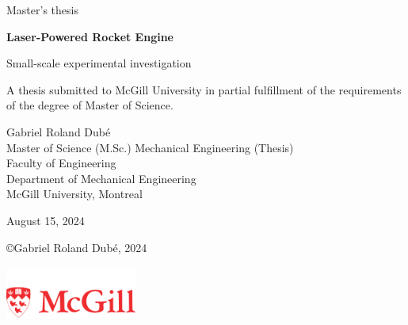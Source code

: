 \begin{titlepage}
    \thispagestyle{empty}
    \sffamily
    \vspace*{3cm}
    {\large \color{cyan}
        Master's thesis
    }

    \vspace{0.3cm}
    {\LARGE \textbf{Laser-Powered Rocket Engine}}

    {\Large Small-scale experimental investigation}

    \vspace{0.2cm}
    {\large 
        A thesis submitted to McGill University in partial fulfillment of the requirements of the degree of Master of Science.

        \vspace{1 cm}
        Gabriel Roland Dubé\\
        Master of Science (M.Sc.) Mechanical Engineering (Thesis) \\
        Faculty of Engineering\\
        Department of Mechanical Engineering\\
        McGill University, Montreal


        \vspace{0.5cm}
        August 15, 2024
    }
    \vfill
    {   
        \copyright Gabriel Roland Dubé, 2024
        
    }
    \vspace{0.5cm}
    \begin{center}
        \hfill
        \includegraphics[height=1.75cm]{assets/McGill_logo.pdf}
    \end{center}
\end{titlepage}